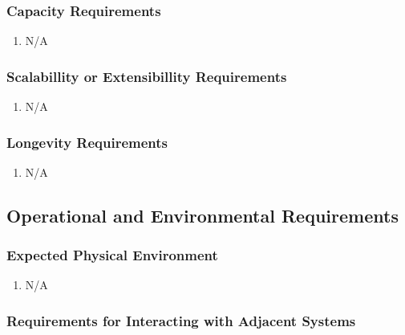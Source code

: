 \documentclass[12pt, titlepage]{article}
\begin{document}
\color{red}

\subsubsection{Capacity Requirements}

\begin{enumerate}[label=CCR\arabic*:, wide=0pt, leftmargin=*]
    \item N/A
\end{enumerate}

\subsubsection{Scalabillity or Extensibillity Requirements}

\begin{enumerate}[label=SER\arabic*:, wide=0pt, leftmargin=*]
    \item N/A
\end{enumerate}

\subsubsection{Longevity Requirements}

\begin{enumerate}[label=LOR\arabic*:, wide=0pt, leftmargin=*]
    \item N/A
\end{enumerate}

\color{black}

\subsection{Operational and Environmental Requirements}

\color{red}

\subsubsection{Expected Physical Environment}

\begin{enumerate}[label=EVE\arabic*:, wide=0pt, leftmargin=*]
    \item N/A
\end{enumerate}

\color{black}

\subsubsection{Requirements for Interacting with Adjacent Systems}
\end{document}
